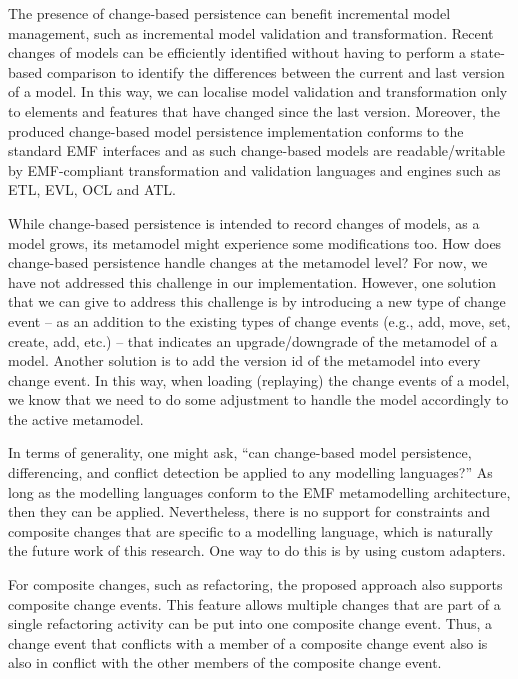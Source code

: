 The presence of change-based persistence can benefit incremental model management, such as incremental model validation and transformation. Recent changes of models can be efficiently identified without having to perform a state-based comparison to identify the differences between the current and last version of a model. In this way, we can localise model validation and transformation only to elements and features that have changed since the last version. Moreover, the produced change-based model persistence implementation conforms to the standard EMF interfaces and as such change-based models are readable/writable by EMF-compliant transformation and validation languages and engines such as ETL, EVL, OCL and ATL.

While change-based persistence is intended to record changes of models, as a model grows, its metamodel might experience some modifications too. How does change-based persistence handle changes at the metamodel level? For now, we have not addressed this challenge in our implementation. However, one solution that we can give to address this challenge is by introducing a new type of change event -- as an addition to the existing types of change events (e.g., add, move, set, create, add, etc.) -- that indicates an upgrade/downgrade of the metamodel of a model. Another solution is to add the version id of the metamodel into every change event. In this way, when loading (replaying) the change events of a model, we know that we need to do some adjustment to handle the model accordingly to the active metamodel.

In terms of generality, one might ask, ``can change-based model persistence, differencing, and conflict detection be applied to any modelling languages?'' As long as the modelling languages conform to the EMF metamodelling architecture, then they can be applied. Nevertheless, there is no support for constraints and composite changes that are specific to a modelling language, which is naturally the future work of this research. One way to do this is by using custom adapters.

For composite changes, such as refactoring, the proposed approach also supports composite change events. This feature allows multiple changes that are part of a single refactoring activity can be put into one composite change event. Thus, a change event that conflicts with a member of a composite change event also is also in conflict with the other members of the composite change event.

